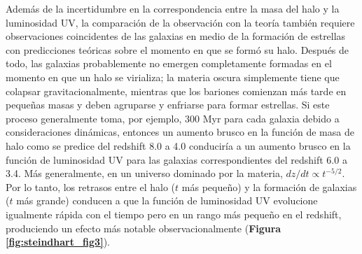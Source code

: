 \documentclass{article}
\begin{document}
Además de la incertidumbre en la correspondencia entre la masa del halo y la luminosidad UV, la comparación de la observación con la teoría también requiere observaciones coincidentes de las galaxias en medio de la formación de estrellas con predicciones teóricas sobre el momento en que se formó su halo. Después de todo, las galaxias probablemente no emergen completamente formadas en el momento en que un halo se virializa; la materia oscura simplemente tiene que colapsar gravitacionalmente, mientras que los bariones comienzan más tarde en pequeñas masas y deben agruparse y enfriarse para formar estrellas. Si este proceso generalmente toma, por ejemplo, 300 Myr para cada galaxia debido a consideraciones dinámicas, entonces un aumento brusco en la función de masa de halo como se predice del redshift 8.0 a 4.0 conduciría a un aumento brusco en la función de luminosidad UV para las galaxias correspondientes del redshift 6.0 a 3.4. Más generalmente, en un universo dominado por la materia, $dz / dt \propto t^{-5/2}$. Por lo tanto, los retrasos entre el halo ($t$ más pequeño) y la formación de galaxias ($t$ más grande) conducen a que la función de luminosidad UV evolucione igualmente rápida con el tiempo pero en un rango más pequeño en el redshift, produciendo un efecto más notable observacionalmente (\textbf{Figura \ref{fig:steindhart_fig3}}). \\
\end{document}
